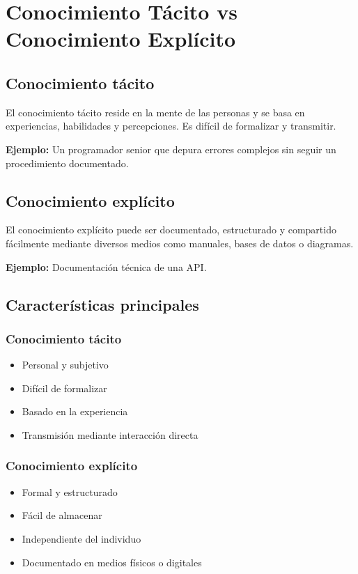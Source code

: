 \documentclass[12pt,a4paper]{article}
\begin{document}
\section{Conocimiento Tácito vs Conocimiento Explícito}

\subsection{Conocimiento tácito}
El conocimiento tácito reside en la mente de las personas y se basa en experiencias, habilidades y percepciones. Es difícil de formalizar y transmitir.

\textbf{Ejemplo:} Un programador senior que depura errores complejos sin seguir un procedimiento documentado.

\subsection{Conocimiento explícito}
El conocimiento explícito puede ser documentado, estructurado y compartido fácilmente mediante diversos medios como manuales, bases de datos o diagramas.

\textbf{Ejemplo:} Documentación técnica de una API.

\subsection{Características principales}

\subsubsection{Conocimiento tácito}
\begin{itemize}
    \item Personal y subjetivo
    \item Difícil de formalizar
    \item Basado en la experiencia
    \item Transmisión mediante interacción directa
\end{itemize}

\subsubsection{Conocimiento explícito}
\begin{itemize}
    \item Formal y estructurado
    \item Fácil de almacenar
    \item Independiente del individuo
    \item Documentado en medios físicos o digitales
\end{itemize}
\end{document}
